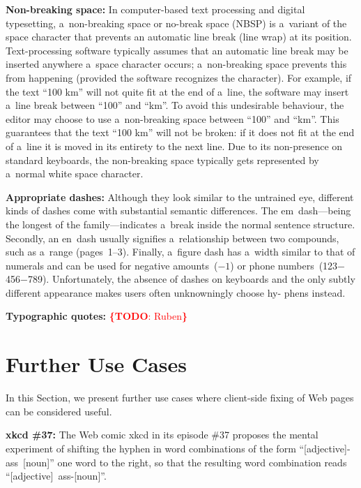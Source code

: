 \documentclass{acm_proc_article-sp}
\newcommand{\todo}[1]{\noindent\textcolor{red}{{\bf \{TODO}: #1{\bf \}}}}
\begin{document}
\textbf{Non-breaking space:} In computer-based text processing and digital typesetting,
a~non-breaking space or no-break space (NBSP) is a~variant of the space character that prevents an automatic line break (line wrap) at its position.
Text-processing software typically assumes that an automatic line break may be inserted anywhere a~space
character occurs;
a~non-breaking space prevents this from happening (provided the software recognizes the character).
For example, if the text ``100 km'' will not quite fit at the end of a~line,
the software may insert a~line break between ``100'' and ``km''.
To avoid this undesirable behaviour, the editor may choose to use a~non-breaking space between ``100'' and ``km''.
This guarantees that the text ``100 km'' will not be broken:
if it does not fit at the end of a~line
it is moved in its entirety to the next line.
Due to its non-presence on standard keyboards,
the non-breaking space typically gets represented by a~normal white space character.

\textbf{Appropriate dashes:} Although they look similar to the untrained eye, different kinds of dashes come with\linebreak%
substantial semantic differences.
The em~dash---being the longest of the family---indicates a~break inside the normal sentence structure.
Secondly, an en~dash usually signifies\linebreak%
a~relationship between two compounds, such as a~range (pages~1--3).
Finally, a~figure dash has a~width similar to that of numerals and can be used for negative amounts~($-1$) or phone numbers~(123$-$456$-$789).
Unfortunately, the\linebreak%
absence of dashes on keyboards and the only subtly different\linebreak%
appearance makes users often unknowningly choose hy-\linebreak%
phens instead.

\textbf{Typographic quotes:} \todo{Ruben}

\section{Further Use Cases}
In this Section, we present further use cases where client-side fixing of Web pages can be considered useful.

\textbf{xkcd \#37:} The Web comic xkcd in its episode \#37 proposes the mental experiment of shifting the hyphen in word combinations of the form \mbox{``[adjective]-ass [noun]''} one word to the right,
so that the resulting word combination reads \mbox{``[adjective] ass-[noun]''}.
\end{document}
